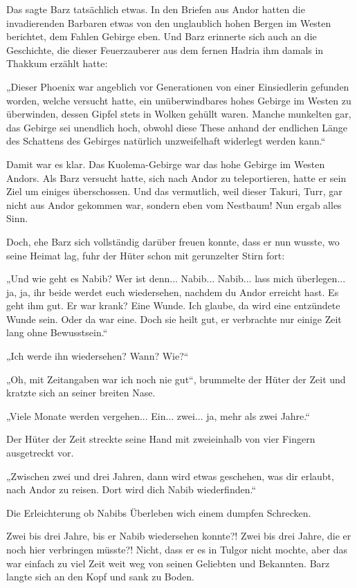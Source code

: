 Das sagte Barz tatsächlich etwas. In den Briefen aus Andor hatten die invadierenden Barbaren etwas von den unglaublich hohen Bergen im Westen berichtet, dem Fahlen Gebirge eben. Und Barz erinnerte sich auch an die Geschichte, die dieser Feuerzauberer aus dem fernen Hadria ihm damals in Thakkum erzählt hatte:

„Dieser Phoenix war angeblich vor Generationen von einer Einsiedlerin gefunden worden, welche versucht hatte, ein unüberwindbares hohes Gebirge im Westen zu überwinden, dessen Gipfel stets in Wolken gehüllt waren. Manche munkelten gar, das Gebirge sei unendlich hoch, obwohl diese These anhand der endlichen Länge des Schattens des Gebirges natürlich unzweifelhaft widerlegt werden kann.“

Damit war es klar. Das Kuolema-Gebirge war das hohe Gebirge im Westen Andors. Als Barz versucht hatte, sich nach Andor zu teleportieren, hatte er sein Ziel um einiges überschossen. Und das vermutlich, weil dieser Takuri, Turr, gar nicht aus Andor gekommen war, sondern eben vom Nestbaum! Nun ergab alles Sinn.

Doch, ehe Barz sich vollständig darüber freuen konnte, dass er nun wusste, wo seine Heimat lag, fuhr der Hüter schon mit gerunzelter Stirn fort:

„Und wie geht es Nabib? Wer ist denn... Nabib... Nabib... lass mich überlegen... ja, ja, ihr beide werdet euch wiedersehen, nachdem du Andor erreicht hast. Es geht ihm gut. Er war krank? Eine Wunde. Ich glaube, da wird eine entzündete Wunde sein. Oder da war eine. Doch sie heilt gut, er verbrachte nur einige Zeit lang ohne Bewusstsein.“

„Ich werde ihn wiedersehen? Wann? Wie?“

„Oh, mit Zeitangaben war ich noch nie gut“, brummelte der Hüter der Zeit und kratzte sich an seiner breiten Nase.

„Viele Monate werden vergehen... Ein... zwei... ja, mehr als zwei Jahre.“

Der Hüter der Zeit streckte seine Hand mit zweieinhalb von vier Fingern ausgetreckt vor.

„Zwischen zwei und drei Jahren, dann wird etwas geschehen, was dir erlaubt, nach Andor zu reisen. Dort wird dich Nabib wiederfinden.“

Die Erleichterung ob Nabibs Überleben wich einem dumpfen Schrecken.

Zwei bis drei Jahre, bis er Nabib wiedersehen konnte?! Zwei bis drei Jahre, die er noch hier verbringen müsste?! Nicht, dass er es in Tulgor nicht mochte, aber das war einfach zu viel Zeit weit weg von seinen Geliebten und Bekannten. Barz langte sich an den Kopf und sank zu Boden.


